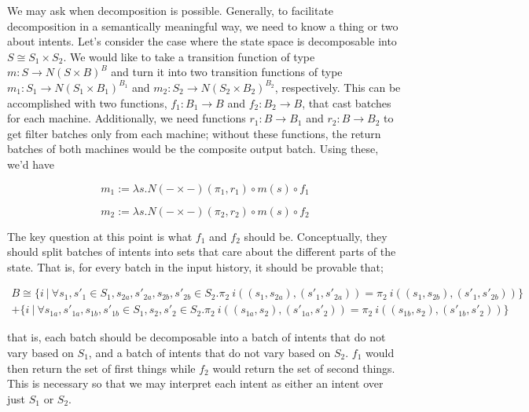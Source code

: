 We may ask when decomposition is possible. Generally, to facilitate decomposition in a semantically meaningful way, we need to know a thing or two about intents. Let's consider the case where the state space is decomposable into $S \cong S_1 \times S_2$. We would like to take a transition function of type $m : S \rightarrow N(S \times B)^B$ and turn it into two transition functions of type $m_1 : S_1 \rightarrow N(S_1 \times B_1)^{B_1}$ and $m_2 : S_2 \rightarrow N(S_2 \times B_2)^{B_2}$, respectively. This can be accomplished with two functions, $f_1 : B_1 \rightarrow B$ and $f_2 : B_2 \rightarrow B$, that cast batches for each machine. Additionally, we need functions $r_1 : B \rightarrow B_1$ and $r_2 : B \rightarrow B_2$ to get filter batches only from each machine; without these functions, the return batches of both machines would be the composite output batch. Using these, we'd have

\begin{equation}
    m_1 := \lambda s. N(- \times -)(\pi_1, r_1) \circ m(s) \circ f_1
\end{equation}

\begin{equation}
    m_2 := \lambda s. N(- \times -)(\pi_2, r_2) \circ m(s) \circ f_2
\end{equation}

The key question at this point is what $f_1$ and $f_2$ should be. Conceptually, they should split batches of intents into sets that care about the different parts of the state. That is, for every batch in the input history, it should be provable that;

\begin{align}
    B \cong \{ i\ |\ \forall s_1, s'_1 \in S_1, s_{2a}, s'_{2a}, s_{2b}, s'_{2b} \in S_2 . \pi_2\ i((s_1, s_{2a}), (s'_1, s'_{2a})) = \pi_2\ i((s_1, s_{2b}), (s'_1, s'_{2b})) \} \\
    + \{ i\ |\ \forall s_{1a}, s'_{1a}, s_{1b}, s'_{1b} \in S_1, s_{2}, s'_{2} \in S_2 . \pi_2\ i((s_{1a}, s_{2}), (s'_{1a}, s'_{2})) = \pi_2\ i((s_{1b}, s_{2}), (s'_{1b}, s'_{2})) \}
\end{align}

that is, each batch should be decomposable into a batch of intents that do not vary based on $S_1$, and a batch of intents that do not vary based on $S_2$. $f_1$ would then return the set of first things while $f_2$ would return the set of second things. This is necessary so that we may interpret each intent as either an intent over just $S_1$ or $S_2$.

